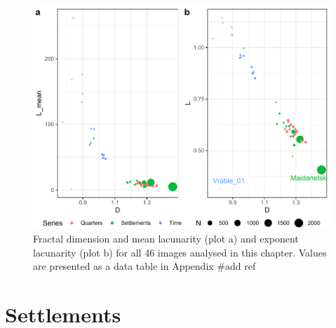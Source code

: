 \documentclass[
  12pt,
]{book}
\begin{document}
\begin{figure}

{\centering \includegraphics[width=0.9\linewidth]{bookdown-demo_files/figure-latex/09-all-1} 

}

\caption{Fractal dimension and mean lacunarity (plot a) and exponent lacunarity (plot b) for all 46 images analysed in this chapter. Values are presented as a data table in Appendix \#add ref}\label{fig:09-all}
\end{figure}

\hypertarget{settlements-1}{%
\section{Settlements}\label{settlements-1}}
\end{document}
